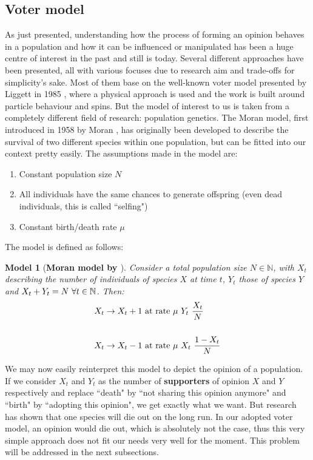 \documentclass[12pt,a4paper,twoside]{article}
\newtheorem{model}{Model}[section]
\begin{document}
\subsection{Voter model}\label{subsec:voter_model}
As just presented, understanding how the process of forming an opinion behaves in a population and how it can be influenced or manipulated has been a huge centre of interest in the past and still is today. Several different approaches have been presented, all with various focuses due to research aim and trade-offs for simplicity's sake. Most of them base on the well-known voter model presented by Liggett in 1985 \cite{Liggett1985}, where a physical approach is used and the work is built around particle behaviour and spins. But the model of interest to us is taken from a completely different field of research: population genetics. The Moran model, first introduced in 1958 by Moran \cite{Moran1958}, has originally been developed to describe the survival of two different species within one population, but can be fitted into our context pretty easily. The assumptions made in the model are:
\begin{enumerate}
	\item Constant population size $N$
	\item All individuals have the same chances to generate offspring (even dead individuals, this is called ``selfing")
	\item Constant birth/death rate $\mu$
\end{enumerate}
The model is defined as follows:
\begin{model}[\textbf{Moran model by \cite{Moran1958, Muller2015}}]\label{model:moran}
	Consider a total population size $N \in \mathbb{N}$, with $X_t$ describing the number of individuals of species $X$ at time $t$, $Y_t$ those of species $Y$ and $X_t + Y_t = N \textnormal{  }\forall t \in \mathbb{N}$. Then:
	\begin{align}
	\begin{split}
		X_t \rightarrow X_t + 1 &\textnormal{ at rate } \mu\textnormal{ }Y_t\textnormal{ }\frac{X_t}{N}\\
		&\\
		X_t \rightarrow X_t - 1 &\textnormal{ at rate } \mu\textnormal{ }X_t\textnormal{ }\frac{1 - X_t}{N}
	\end{split}
	\end{align}
\end{model}
We may now easily reinterpret this model to depict the opinion of a population. If we consider $X_t$ and $Y_t$ as the number of \textbf{supporters} of opinion $X$ and $Y$ respectively and replace ``death" by ``not sharing this opinion anymore" and ``birth" by ``adopting this opinion", we get exactly what we want. But research has shown that one species will die out on the long run. In our adopted voter model, an opinion would die out, which is absolutely not the case, thus this very simple approach does not fit our needs very well for the moment. This problem will be addressed in the next subsections.
\end{document}
